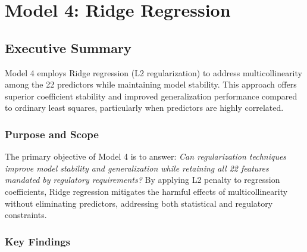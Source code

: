 \chapter{Model 4: Ridge Regression}\label{ch:model4}




\def\themodel{4}

\section{Executive Summary}

Model 4 employs Ridge regression (L2 regularization) to address multicollinearity among the 22 predictors while maintaining model stability. This approach offers superior coefficient stability and improved generalization performance compared to ordinary least squares, particularly when predictors are highly correlated.

\subsection{Purpose and Scope}

The primary objective of Model 4 is to answer: \textit{Can regularization techniques improve model stability and generalization while retaining all 22 features mandated by regulatory requirements?} By applying L2 penalty to regression coefficients, Ridge regression mitigates the harmful effects of multicollinearity without eliminating predictors, addressing both statistical and regulatory constraints.

\subsection{Key Findings}

